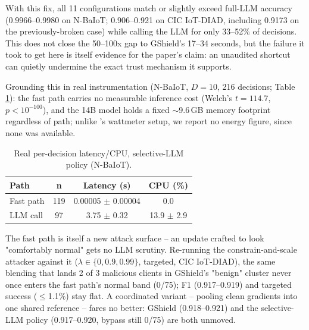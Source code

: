 \documentclass[conference]{IEEEtran}
\begin{document}
With this fix, all 11 configurations match or slightly exceed full-LLM accuracy (0.9966--0.9980 on N-BaIoT; 0.906--0.921 on CIC IoT-DIAD, including 0.9173 on the previously-broken case) while calling the LLM for only 33--52\% of decisions. This does not close the 50--100x gap to GShield's 17--34 seconds, but the failure it took to get here is itself evidence for the paper's claim: an unaudited shortcut can quietly undermine the exact trust mechanism it supports.

Grounding this in real instrumentation (N-BaIoT, $D{=}10$, 216 decisions; Table \ref{tab:resource}): the fast path carries no measurable inference cost (Welch's $t{=}114.7$, $p<10^{-100}$), and the 14B model holds a fixed $\sim$9.6\,GB memory footprint regardless of path; unlike \cite{jamshidi2026thinkfast}'s wattmeter setup, we report no energy figure, since none was available.

\begin{table}[t]
\centering
\scriptsize
\caption{Real per-decision latency/CPU, selective-LLM policy (N-BaIoT).}
\label{tab:resource}
\begin{tabular}{@{}lccc@{}}
\toprule
\textbf{Path} & \textbf{n} & \textbf{Latency (s)} & \textbf{CPU (\%)} \\
\midrule
Fast path & 119 & 0.00005 $\pm$ 0.00004 & 0.0 \\
LLM call & 97 & 3.75 $\pm$ 0.32 & 13.9 $\pm$ 2.9 \\
\bottomrule
\end{tabular}
\end{table}

The fast path is itself a new attack surface -- an update crafted to look "comfortably normal" gets no LLM scrutiny. Re-running the constrain-and-scale attacker against it ($\lambda\in\{0, 0.9, 0.99\}$, targeted, CIC IoT-DIAD), the same blending that lands 2 of 3 malicious clients in GShield's "benign" cluster never once enters the fast path's normal band (0/75); F1 (0.917--0.919) and targeted success ($\leq$1.1\%) stay flat. A coordinated variant -- pooling clean gradients into one shared reference -- fares no better: GShield (0.918--0.921) and the selective-LLM policy (0.917--0.920, bypass still 0/75) are both unmoved.
\end{document}
